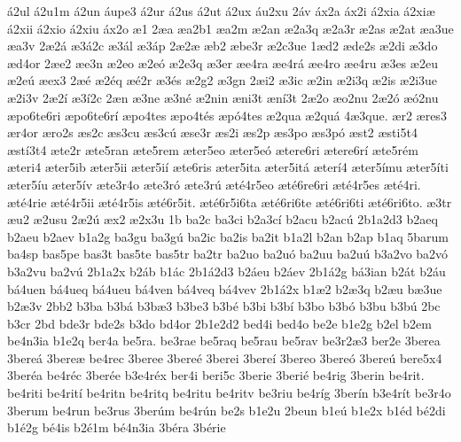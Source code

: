 {^^e12ul
^^e12u1m
^^e12un
^^e1upe3
^^e12ur
^^e12us
^^e12ut
^^e12ux
^^e1u2xu
2^^e1v
^^e1x2a
^^e1x2i
^^e12xia
^^e12xi^^e6
^^e12xii
^^e12xio
^^e12xiu
^^e1x2o
^^e61
2^^e6a
^^e6a2b1
^^e6a2m
^^e62an
^^e62a3q
^^e62a3r
^^e62as
^^e62at
^^e6a3ue
^^e6a3v
2^^e62^^e1
^^e63^^e12c
^^e63^^e1l
^^e63^^e1p
2^^e62^^e6
^^e6b2
^^e6be3r
^^e62c3ue
1^^e6d2
^^e6de2s
^^e62di
^^e63do
^^e6d4or
2^^e6e2
^^e6e3n
^^e62eo
^^e62e^^f3
^^e62e3q
^^e63er
^^e6e4ra
^^e6e4r^^e1
^^e6e4ro
^^e6e4ru
^^e63es
^^e62eu
^^e62e^^fa
^^e6ex3
2^^e6^^e9
^^e62^^e9q
^^e6^^e92r
^^e63^^e9s
^^e62g2
^^e63gn
2^^e6i2
^^e63ic
^^e62in
^^e62i3q
^^e62is
^^e62i3ue
^^e62i3v
2^^e62^^ed
^^e63^^ed2c
2^^e6n
^^e63ne
^^e63n^^e9
^^e62nin
^^e6ni3t
^^e6n^^ed3t
2^^e62o
^^e6o2nu
2^^e62^^f3
^^e6^^f32nu
^^e6po6te6ri
^^e6po6te6r^^ed
^^e6po4tes
^^e6po4t^^e9s
^^e6p^^f34tes
^^e62qua
^^e62qu^^e1
4^^e63que.
^^e6r2
^^e6res3
^^e6r4or
^^e6ro2s
^^e6s2c
^^e6s3cu
^^e6s3c^^fa
^^e6se3r
^^e6s2i
^^e6s2p
^^e6s3po
^^e6s3p^^f3
^^e6st2
^^e6sti5t4
^^e6st^^ed3t4
^^e6te2r
^^e6te5ran
^^e6te5rem
^^e6ter5eo
^^e6ter5e^^f3
^^e6tere6ri
^^e6tere6r^^ed
^^e6te5r^^e9m
^^e6teri4
^^e6ter5ib
^^e6ter5ii
^^e6ter5i^^ed
^^e6te6ris
^^e6ter5ita
^^e6ter5it^^e1
^^e6ter^^ed4
^^e6ter5^^edmu
^^e6ter5^^edti
^^e6ter5^^edu
^^e6ter5^^edv
^^e6te3r4o
^^e6te3r^^f3
^^e6te3r^^fa
^^e6t^^e94r5eo
^^e6t^^e96re6ri
^^e6t^^e94r5es
^^e6t^^e94ri.
^^e6t^^e94rie
^^e6t^^e94r5ii
^^e6t^^e94r5is
^^e6t^^e96r5it.
^^e6t^^e96r5i6ta
^^e6t^^e96ri6te
^^e6t^^e96ri6ti
^^e6t^^e96ri6to.
^^e63tr
^^e6u2
^^e62usu
2^^e62^^fa
^^e6x2
^^e62x3u
1b
ba2c
ba3ci
b2a3c^^ed
b2acu
b2ac^^fa
2b1a2d3
b2aeq
b2aeu
b2aev
b1a2g
ba3gu
ba3g^^fa
ba2ic
ba2is
ba2it
b1a2l
b2an
b2ap
b1aq
5barum
ba4sp
bas5pe
bas3t
bas5te
bas5tr
ba2tr
ba2uo
ba2u^^f3
ba2uu
ba2u^^fa
b3a2vo
ba2v^^f3
b3a2vu
ba2v^^fa
2b1a2x
b2^^e1b
b1^^e1c
2b1^^e12d3
b2^^e1eu
b2^^e1ev
2b1^^e12g
b^^e13ian
b2^^e1t
b2^^e1u
b^^e14uen
b^^e14ueq
b^^e14ueu
b^^e14ven
b^^e14veq
b^^e14vev
2b1^^e12x
b1^^e62
b2^^e63q
b2^^e6u
b^^e63ue
b2^^e63v
2bb2
b3ba
b3b^^e1
b3b^^e63
b3be3
b3b^^e9
b3bi
b3b^^ed
b3bo
b3b^^f3
b3bu
b3b^^fa
2bc
b3cr
2bd
bde3r
bde2s
b3do
bd4or
2b1e2d2
bed4i
bed4o
be2e
b1e2g
b2el
b2em
be4n3ia
b1e2q
ber4a
be5ra.
be3rae
be5raq
be5rau
be5rav
be3r2^^e63
ber2e
3berea
3bere^^e1
3bere^^e6
be4rec
3beree
3bere^^e9
3berei
3bere^^ed
3bereo
3bere^^f3
3bere^^fa
bere5x4
3ber^^e9a
be4r^^e9c
3ber^^e9e
b3e4r^^e9x
ber4i
beri5c
3berie
3beri^^e9
be4rig
3berin
be4rit.
be4riti
be4rit^^ed
be4ritn
be4ritq
be4ritu
be4ritv
be3riu
be4r^^edg
3ber^^edn
b3e4r^^edt
be3r4o
3berum
be4run
be3rus
3ber^^fam
be4r^^fan
be2s
b1e2u
2beun
b1e^^fa
b1e2x
b1^^e9d
b^^e92di
b1^^e92g
b^^e94is
b2^^e91m
b^^e94n3ia
3b^^e9ra
3b^^e9rie
}
